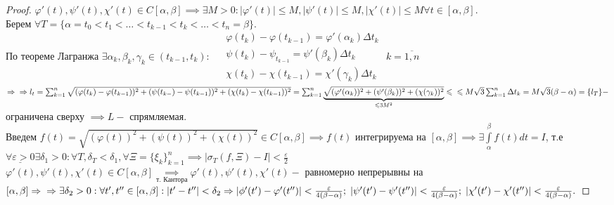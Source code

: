 \documentclass[../main.tex]{subfiles}
\begin{document}
\newpage
{}
\begin{proof}
    $\varphi'(t),\psi'(t), \chi'(t) \in C[\alpha,\beta] \implies \exists M>0: |\varphi'(t)|\leqslant M, |\psi'(t)|\leqslant M, |\chi'(t)|\leqslant M \forall t \in [\alpha,\beta].$\\ 
    Берем $\forall T=\{\alpha=t_{0}<t_{1}<\dots<t_{k-1}<t_{k}<\dots<t_{ n}=\beta\}.$ \\По теореме Лагранжа $\exists \alpha_{k},\beta_{k},\gamma_{k}\in (t_{k-1},t_{k}): $
    $\begin{aligned} &\varphi(t_{k})-\varphi(t_{k-1})=\varphi'(\alpha_{k})\Delta t_{k}\\ &\psi(t_{k})-\psi_{t_{k-1}}=\psi'(\beta_{k})\Delta t_{k}\\ &\chi(t_{k})-\chi(t_{k-1})=\chi'(\gamma_{k})\Delta t_{k}\end{aligned} $ $k=\overline{1,n}$
    $\implies\\\implies l_{t}=\sum_{k=1}^{n} \sqrt{(\varphi(t_{k})-\varphi(t_{k-1}))^{2}+(\psi(t_{k-})-\psi(t_{k-1}))^{2}+(\chi(t_{k})-\chi(t_{k-1}))^{2}} = \sum_{k=1}^{n    } \underbrace{\sqrt{{(\varphi'(\alpha_{k}))^{2}}+(\psi'(\beta_{k}))^{2}+(\chi(\gamma_{k}))^{2}}}_{\leqslant 3M^{2}}\leqslant\\\leqslant M\sqrt{3}\sum_{k=1}^{n   } \Delta t_{k}=M \sqrt{3}(\beta-\alpha)=\{l_{T}\}-$ ограничена сверху $\implies L-$ спрямляемая. 
    \\ Введем $f(t)=\sqrt{(\varphi(t))^{2}+(\psi(t))^{2}+(\chi(t))^{2}}\in C[\alpha,\beta]\implies f(t) $ интегрируема на $[\alpha,\beta]\implies \exists \int\limits_{\alpha       }^{\beta} f(t)dt=I$, т.е $\underline{\forall \varepsilon>0} \exists \delta_{1}>0: \forall T, \delta_{T}<\delta_{1}, \forall \Xi=\{\xi_{k}\}_{k=1}^{n}\implies |\sigma_{T}(f,\Xi)-I| < \frac{\varepsilon}{2}$ 
    \\$\varphi'(t),\psi'(t),\chi'(t)\in C[\alpha,\beta]\underset{\text{т. Кантора}}{\implies} \varphi'(t),\psi'(t),\chi'(t) - $ равномерно непрерывны на $[\alpha,\beta]\implies \\ \implies \exists \delta_{2}>0 : \forall t',t'' \in [\alpha,\beta] : |t'-t''|<\delta_{2} \implies |\phi'(t')-\varphi'(t'')|<\frac{\varepsilon}{4(\beta-\alpha)}; \; |\psi'(t')-\psi'(t'')|<\frac{\varepsilon}{4(\beta-\alpha)}; \; |\chi'(t')-\chi'(t'')|<\frac{\varepsilon}{4(\beta-\alpha)}.$

\end{proof}
\end{document}
